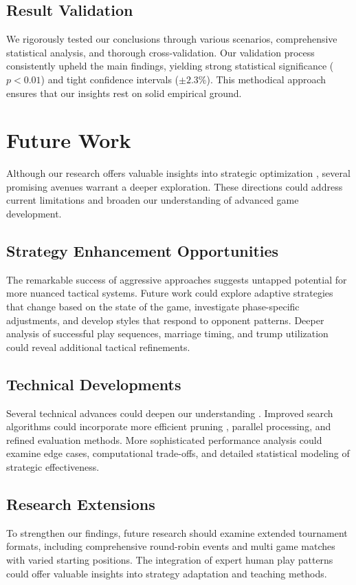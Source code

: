\documentclass[runningheads]{llncs}
\begin{document}
\subsection{Result Validation}
We rigorously tested our conclusions through various scenarios, comprehensive statistical analysis, and thorough cross-validation. Our validation process consistently upheld the main findings, yielding strong statistical significance ($p < 0.01$) and tight confidence intervals ($\pm 2.3\%$). This methodical approach ensures that our insights rest on solid empirical ground.

\section{Future Work}
Although our research offers valuable insights into strategic optimization \cite{ref_alpha_beta}, several promising avenues warrant a deeper exploration. These directions could address current limitations and broaden our understanding of advanced game development.

\subsection{Strategy Enhancement Opportunities}
The remarkable success of aggressive approaches suggests untapped potential for more nuanced tactical systems. Future work could explore adaptive strategies that change based on the state of the game, investigate phase-specific adjustments, and develop styles that respond to opponent patterns. Deeper analysis of successful play sequences, marriage timing, and trump utilization could reveal additional tactical refinements.

\subsection{Technical Developments}
Several technical advances could deepen our understanding \cite{ref_alpha_beta_cards}. Improved search algorithms could incorporate more efficient pruning \cite{ref_alpha_beta}, parallel processing, and refined evaluation methods. More sophisticated performance analysis could examine edge cases, computational trade-offs, and detailed statistical modeling of strategic effectiveness.

\subsection{Research Extensions}
To strengthen our findings, future research should examine extended tournament formats, including comprehensive round-robin events and multi game matches with varied starting positions. The integration of expert human play patterns could offer valuable insights into strategy adaptation and teaching methods.
\end{document}

